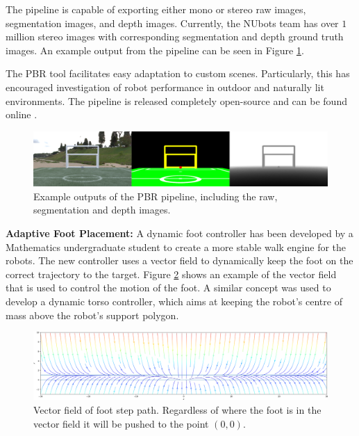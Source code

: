 \documentclass{llncs}
\begin{document}
The pipeline is capable of exporting either mono or stereo raw images, segmentation images, and depth images. Currently, the NUbots team has over $1$ million stereo images with corresponding segmentation and depth ground truth images. An example output from the pipeline can be seen in Figure \ref{fig:pbrExample}.

The PBR tool facilitates easy adaptation to custom scenes. Particularly, this has encouraged investigation of robot performance in outdoor and naturally lit environments. The pipeline is released completely open-source and can be found online \cite{nubotsNUpbrGit}.\\

\begin{figure}[h!]
    \centering
    \includegraphics[width=0.99\linewidth]{NUpbr.png}
    \caption{Example outputs of the PBR pipeline, including the raw, segmentation and depth images.}
    \label{fig:pbrExample}
\end{figure}

\noindent\textbf{Adaptive Foot Placement:} 
A dynamic foot controller has been developed by a Mathematics undergraduate student to create a more stable walk engine for the robots. The new controller uses a vector field to dynamically keep the foot on the correct trajectory to the target. Figure \ref{fig:vec_field} shows an example of the vector field that is used to control the motion of the foot. A similar concept was used to develop a dynamic torso controller, which aims at keeping the robot's centre of mass above the robot's support polygon.\\

\begin{figure}[h!]
    \centering
    \includegraphics[width=0.99\linewidth]{VectorFieldPlot.png}
    \caption{Vector field of foot step path. Regardless of where the foot is in the vector field it will be pushed to the point $\left(0, 0\right)$.}
    \label{fig:vec_field}
\end{figure}
\end{document}
